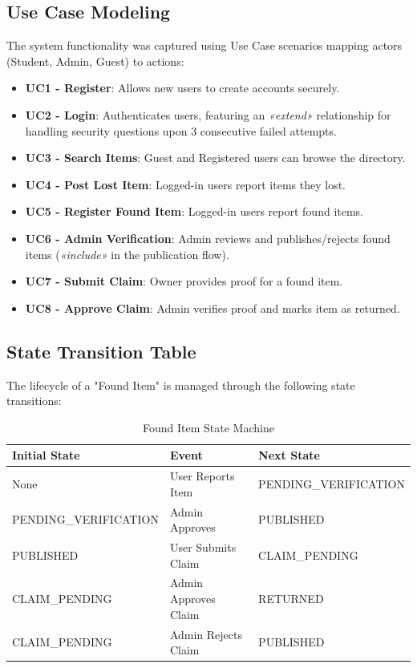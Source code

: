\documentclass[12pt, a4paper]{article}
\begin{document}
\subsection{Use Case Modeling}
The system functionality was captured using Use Case scenarios mapping actors (Student, Admin, Guest) to actions:
\begin{itemize}
    \item \textbf{UC1 - Register}: Allows new users to create accounts securely.
    \item \textbf{UC2 - Login}: Authenticates users, featuring an \textit{«extend»} relationship for handling security questions upon 3 consecutive failed attempts.
    \item \textbf{UC3 - Search Items}: Guest and Registered users can browse the directory.
    \item \textbf{UC4 - Post Lost Item}: Logged-in users report items they lost.
    \item \textbf{UC5 - Register Found Item}: Logged-in users report found items.
    \item \textbf{UC6 - Admin Verification}: Admin reviews and publishes/rejects found items (\textit{«include»} in the publication flow).
    \item \textbf{UC7 - Submit Claim}: Owner provides proof for a found item.
    \item \textbf{UC8 - Approve Claim}: Admin verifies proof and marks item as returned.
\end{itemize}

\subsection{State Transition Table}
The lifecycle of a "Found Item" is managed through the following state transitions:
\begin{table}[H]
    \centering
    \begin{tabularx}{\textwidth}{|l|l|X|}
        \hline
        \textbf{Initial State} & \textbf{Event} & \textbf{Next State} \\
        \hline
        None & User Reports Item & PENDING\_VERIFICATION \\
        \hline
        PENDING\_VERIFICATION & Admin Approves & PUBLISHED \\
        \hline
        PUBLISHED & User Submits Claim & CLAIM\_PENDING \\
        \hline
        CLAIM\_PENDING & Admin Approves Claim & RETURNED \\
        \hline
        CLAIM\_PENDING & Admin Rejects Claim & PUBLISHED \\
        \hline
    \end{tabularx}
    \caption{Found Item State Machine}
\end{table}
\end{document}
